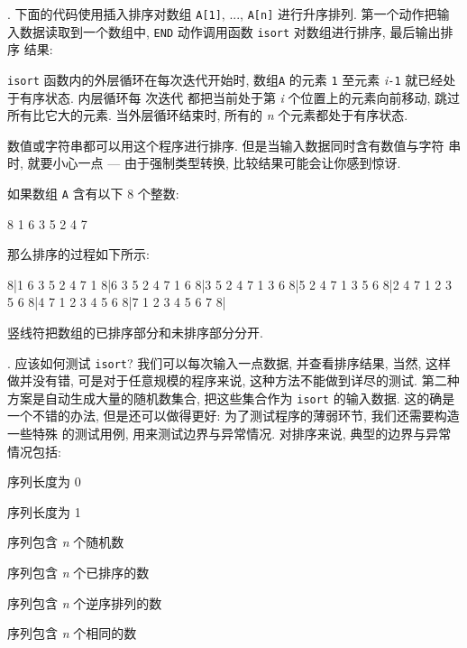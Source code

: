 . 下面的代码使用插入排序对数组 \texttt{A[1]}, ...,%
%
\texttt{A[n]} 进行升序排列. 第一个动作把输入数据读取到一个数组中,
\texttt{END} 动作调用函数 \texttt{isort} 对数组进行排序, 最后输出排序
结果:
\texttt{isort} 函数内的外层循环在每次迭代开始时, 数组\texttt{A} 的元素
\texttt{1} 至元素 \textit{i}\texttt{-1} 就已经处于有序状态. 内层循环每
次迭代
都把当前处于第 \textit{i} 个位置上的元素向前移动, 跳过所有比它大的元素.
当外层循环结束时, 所有的 \textit{n} 个元素都处于有序状态.

数值或字符串都可以用这个程序进行排序. 但是当输入数据同时含有数值与字符
串时, 就要小心一点 --- 由于强制类型转换, 比较结果可能会让你感到惊讶.

如果数组 \texttt{A} 含有以下 8 个整数:
\begin{file}
    8 1 6 3 5 2 4 7
\end{file}
那么排序的过程如下所示:
\begin{file}
    8|1 6 3 5 2 4 7
    1 8|6 3 5 2 4 7
    1 6 8|3 5 2 4 7
    1 3 6 8|5 2 4 7
    1 3 5 6 8|2 4 7
    1 2 3 5 6 8|4 7
    1 2 3 4 5 6 8|7
    1 2 3 4 5 6 7 8|
\end{file}
竖线符把数组的已排序部分和未排序部分分开.

. 应该如何测试 \texttt{isort}? 我们可以每次输入一点数据,
并查看排序结果, 当然, 这样做并没有错, 可是对于任意规模的程序来说,
这种方法不能做到详尽的测试. 第二种方案是自动生成大量的随机数集合,
把这些集合作为 \texttt{isort} 的输入数据. 这的确是一个不错的办法,
但是还可以做得更好: 为了测试程序的薄弱环节, 我们还需要构造一些特殊
的测试用例, 用来测试边界与异常情况.
 对排序来说, 典型的边界与异常情况包括:
\begin{pattern}
\indent 序列长度为 0 \par
\indent 序列长度为 1 \par
\indent 序列包含 \textit{n} 个随机数 \par
\indent 序列包含 \textit{n} 个已排序的数 \par
\indent 序列包含 \textit{n} 个逆序排列的数 \par
\indent 序列包含 \textit{n} 个相同的数
\end{pattern}

